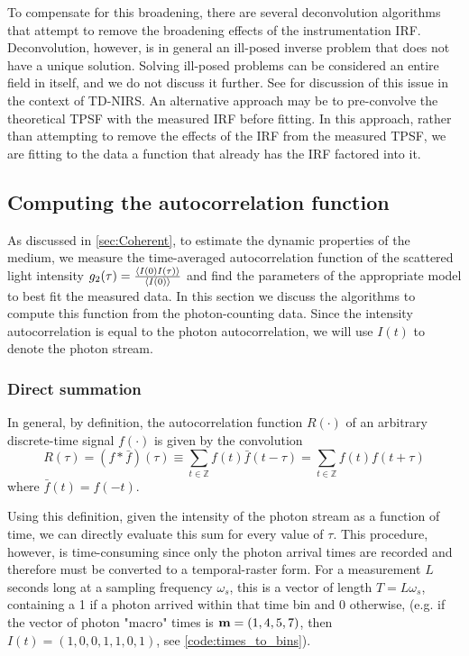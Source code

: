 To compensate for this broadening, there are several deconvolution algorithms that attempt to remove the broadening effects of the instrumentation IRF. Deconvolution, however, is in general an ill-posed inverse problem that does not have a unique solution. Solving ill-posed problems can be considered an entire field in itself, and we do not discuss it further. See \cite[ch. 20]{Handbook} for discussion of this issue in the context of TD-NIRS. An alternative approach may be to pre-convolve the theoretical TPSF with the measured IRF before fitting. In this approach, rather than attempting to remove the effects of the IRF from the measured TPSF, we are fitting to the data a function that already has the IRF factored into it. 

\subsection{Computing the autocorrelation function} \label{sec:acf_comp}
As discussed in \autoref{sec:Coherent}, to estimate the dynamic properties of the medium, we measure the time-averaged autocorrelation function of the scattered light intensity $g_2(\tau) = \frac{\expval{I(0)I(\tau)}} {\expval{I(0)}}$ and find the parameters of the appropriate model to best fit the measured data. In this section we discuss the algorithms to compute this function from the photon-counting data. Since the intensity autocorrelation is equal to the photon autocorrelation, we will use $I(t)$ to denote the photon stream.

\subsubsection{Direct summation}
In general, by definition, the autocorrelation function $R(\cdot)$ of an arbitrary discrete-time signal $f(\cdot)$ is given by the convolution
\begin{equation} \label{eq:acor_def}
R(\tau) = (f*\bar{f})(\tau) 
        \equiv \sum_{t\in\mathbb{Z}}f(t)\bar{f}(t-\tau) 
        = \sum_{t\in\mathbb{Z}}f(t)f(t+\tau) 
\end{equation}
where $\bar{f}(t) = f(-t)$.

Using this definition, given the intensity of the photon stream as a function of time, we can directly evaluate this sum for every value of $\tau$. This procedure, however, is time-consuming since only the photon arrival times are recorded and therefore must be converted to a temporal-raster form. For a measurement $L$ seconds long at a sampling frequency $\omega_s$, this is a vector of length $T = L\omega_s$, containing a 1 if a photon arrived within that time bin and 0 otherwise, (e.g. if the vector of photon "macro" times is $\vb{m} = (1,4,5,7)$, then $I(t) = (1,0,0,1,1,0,1)$, see \autoref{code:times_to_bins}). 


